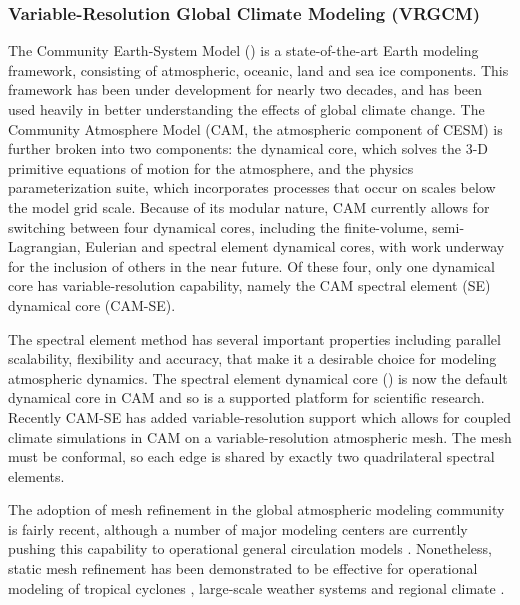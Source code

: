 \documentclass[11pt]{article}
\begin{document}
\subsubsection{Variable-Resolution Global Climate Modeling (VRGCM)}

The Community Earth-System Model (\citet{hurrell2013community}) is a state-of-the-art Earth modeling framework, consisting of atmospheric, oceanic, land and sea ice components. This framework has been under development for nearly two decades, and has been used heavily in better understanding the effects of global climate change. The Community Atmosphere Model (CAM, the atmospheric component of CESM) is further broken into two components: the dynamical core, which solves the 3-D primitive equations of motion for the atmosphere, and the physics parameterization suite, which incorporates processes that occur on scales below the model grid scale. Because of its modular nature, CAM currently allows for switching between four dynamical cores, including the finite-volume, semi-Lagrangian, Eulerian and spectral element dynamical cores, with work underway for the inclusion of others in the near future. Of these four, only one dynamical core has variable-resolution capability, namely the CAM spectral element (SE) dynamical core (CAM-SE).

The spectral element method has several important properties including parallel scalability, flexibility and accuracy, that make it a desirable choice for modeling atmospheric dynamics.  The spectral element dynamical core (\citet{fournier2004spectral, taylor2010compatible}) is now the default dynamical core in CAM and so is a supported platform for scientific research. Recently CAM-SE has added variable-resolution support which allows for coupled climate simulations in CAM on a variable-resolution atmospheric mesh. The mesh must be conformal, so each edge is shared by exactly two quadrilateral spectral elements. 

The adoption of mesh refinement in the global atmospheric modeling community is fairly recent, although a number of major modeling centers are currently pushing this capability to operational general circulation models \cite{skamarock2012mpas, LMHSJL2013MWR, CMZCJMAT2013MWR, mccorquodale2014adaptive}.   Nonetheless, static mesh refinement has been demonstrated to be effective for operational modeling of tropical cyclones \cite{zarzycki2014multidecadal, zarzycki2014using}, large-scale weather systems \cite{rauscher2014impact} and regional climate \cite{rauscher2013exploring, zarzycki2014aquaplanet}.
\end{document}
